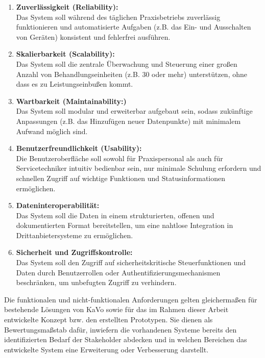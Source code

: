 \begin{enumerate}
    \item \textbf{Zuverlässigkeit (Reliability):} \\
    Das System soll während des täglichen Praxisbetriebs zuverlässig funktionieren und automatisierte Aufgaben (z.B. das Ein- und Ausschalten von Geräten) konsistent und fehlerfrei ausführen.\\

    \item \textbf{Skalierbarkeit (Scalability):} \\
    Das System soll die zentrale Überwachung und Steuerung einer großen Anzahl von Behandlungseinheiten (z.B. 30 oder mehr) unterstützen, ohne dass es zu Leistungseinbußen kommt.\\

    \item \textbf{Wartbarkeit (Maintainability:)} \\
    Das System soll modular und erweiterbar aufgebaut sein, sodass zukünftige Anpassungen (z.B. das Hinzufügen neuer Datenpunkte) mit minimalem Aufwand möglich sind.\\

    \item \textbf{Benutzerfreundlichkeit (Usability):} \\
    Die Benutzeroberfläche soll sowohl für Praxispersonal als auch für Servicetechniker intuitiv bedienbar sein, nur minimale Schulung erfordern und schnellen Zugriff auf wichtige Funktionen und Statusinformationen ermöglichen.\\

    \item \textbf{Dateninteroperabilität:} \\
    Das System soll die Daten in einem strukturierten, offenen und dokumentierten Format bereitstellen, um eine nahtlose Integration in Drittanbietersysteme zu ermöglichen.\\

    \item \textbf{Sicherheit und Zugriffskontrolle:} \\
    Das System soll den Zugriff auf sicherheitskritische Steuerfunktionen und Daten durch Benutzerrollen oder Authentifizierungsmechanismen beschränken, um unbefugten Zugriff zu verhindern.
\end{enumerate}

Die funktionalen und nicht-funktionalen Anforderungen gelten gleichermaßen für bestehende Lösungen von KaVo sowie für das im Rahmen dieser Arbeit entwickelte Konzept bzw. den erstellten Prototypen. Sie dienen als Bewertungsmaßstab dafür, inwiefern die vorhandenen Systeme bereits den identifizierten Bedarf der Stakeholder abdecken und in welchen Bereichen das entwickelte System eine Erweiterung oder Verbesserung darstellt.


